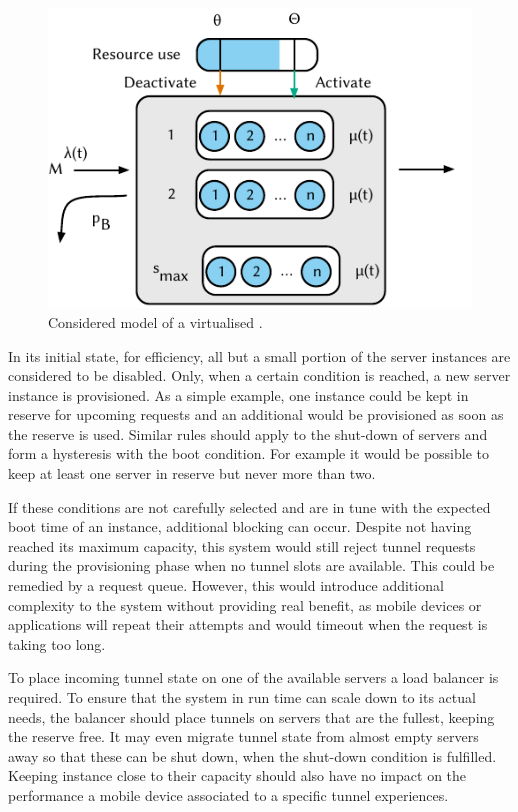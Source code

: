 \begin{figure}
  \centering
  \includegraphics{cloud/virtualized_network_functions/model/figures/virtual_ggsn}
  \caption{Considered model of a virtualised .}
  \label{sec:cloud:virtualized_network_functions:model:virtual_ggsn:model}
\end{figure}

In its initial state, for efficiency, all but a small portion of the server instances are considered to be disabled.
Only, when a certain condition is reached, a new server instance is provisioned.
As a simple example, one instance could be kept in reserve for upcoming requests and an additional would be provisioned as soon as the reserve is used.
Similar rules should apply to the shut-down of servers and form a hysteresis with the boot condition.
For example it would be possible to keep at least one server in reserve but never more than two.

If these conditions are not carefully selected and are in tune with the expected boot time of an instance, additional blocking can occur.
Despite not having reached its maximum capacity, this system would still reject tunnel requests during the provisioning phase when no tunnel slots are available.
This could be remedied by a request queue.
However, this would introduce additional complexity to the system without providing real benefit, as mobile devices or applications will repeat their attempts and would timeout when the request is taking too long.

To place incoming tunnel state on one of the available servers a load balancer is required.
To ensure that the system in run time can scale down to its actual needs, the balancer should place tunnels on servers that are the fullest, keeping the reserve free.
It may even migrate tunnel state from almost empty servers away so that these can be shut down, when the shut-down condition is fulfilled.
Keeping instance close to their capacity should also have no impact on the performance a mobile device associated to a specific tunnel experiences.
